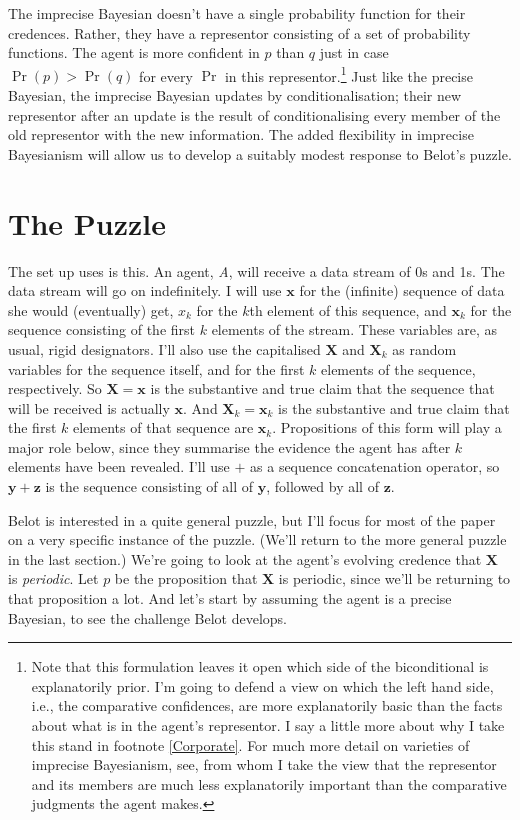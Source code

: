 \documentclass{ergoclass}
\newcommand{\vx}{\boldsymbol{x}}
\newcommand{\vX}{\boldsymbol{X}}
\newcommand{\vy}{\boldsymbol{y}}
\newcommand{\vz}{\boldsymbol{z}}
\begin{document}
The imprecise Bayesian doesn't have a single probability function for their credences. Rather, they have a representor consisting of a set of probability functions. The agent is more confident in $p$ than $q$ just in case $\Pr(p) > \Pr(q)$ for every $\Pr$ in this representor.\footnote{Note that this formulation leaves it open which side of the biconditional is explanatorily prior. I'm going to defend a view on which the left hand side, i.e., the comparative confidences, are more explanatorily basic than the facts about what is in the agent's representor. I say a little more about why I take this stand in footnote \ref{Corporate}. For much more detail on varieties of imprecise Bayesianism, see\cite{Walley1991}, from whom I take the view that the representor and its members are much less explanatorily important than the comparative judgments the agent makes.} Just like the precise Bayesian, the imprecise Bayesian updates by conditionalisation; their new representor after an update is the result of conditionalising every member of the old representor with the new information. The added flexibility in imprecise Bayesianism will allow us to develop a suitably modest response to Belot's puzzle.

\section{The Puzzle}

The set up\citet[493-5]{Belot2013} uses is this. An agent, \textit{A}, will receive a data stream of 0s and 1s. The data stream will go on indefinitely. I will use $\vx$ for the (infinite) sequence of data she would (eventually) get, $x_k$ for the $k$th element of this sequence, and $\vx_k$ for the sequence consisting of the first $k$ elements of the stream. These variables are, as usual, rigid designators. I'll also use the capitalised $\vX$ and $\vX_k$ as random variables for the sequence itself, and for the first $k$ elements of the sequence, respectively. So $\vX = \vx$ is the substantive and true claim that the sequence that will be received is actually $\vx$. And $\vX_k = \vx_k$ is the substantive and true claim that the first $k$ elements of that sequence are $\vx_k$. Propositions of this form will play a major role below, since they summarise the evidence the agent has after $k$ elements have been revealed. I'll use $+$ as a sequence concatenation operator, so $\vy + \vz$ is the sequence consisting of all of $\vy$, followed by all of $\vz$.

Belot is interested in a quite general puzzle, but I'll focus for most of the paper on a very specific instance of the puzzle. (We'll return to the more general puzzle in the last section.) We're going to look at the agent's evolving credence that $\vX$ is \textit{periodic}. Let $p$ be the proposition that $\vX$ is periodic, since we'll be returning to that proposition a lot. And let's start by assuming the agent is a precise Bayesian, to see the challenge Belot develops.
\end{document}
